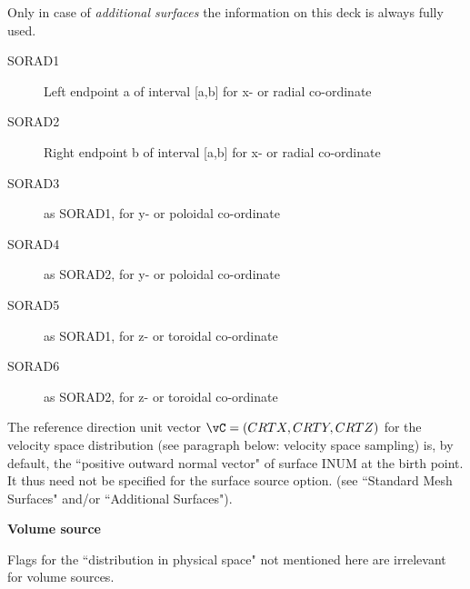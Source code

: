 Only in case of \emph{additional surfaces} the information on this deck is
always fully used.
\begin{description}
  \item[SORAD1] Left endpoint a of interval [a,b] for x- or radial co-ordinate
  \item[SORAD2] Right endpoint b of interval [a,b] for x- or radial co-ordinate
  \item[SORAD3] as SORAD1, for y- or poloidal co-ordinate
  \item[SORAD4] as
        SORAD2, for y- or poloidal co-ordinate
  \item[SORAD5] as SORAD1, for z- or
        toroidal co-ordinate
  \item[SORAD6] as SORAD2, for z- or toroidal co-ordinate
\end{description}

The reference direction unit vector $\vC = (CRTX,CRTY,CRTZ)$ for the velocity
space distribution (see paragraph below: velocity space sampling) is, by
default, the ``positive outward normal vector" of surface INUM at the birth
point.
It thus need not be specified for the surface source option.
(see ``Standard Mesh Surfaces" and/or ``Additional Surfaces").

\medskip

\textcolor[rgb]{0.00,0.00,1.00}{\textbf{Volume source}}

Flags for the ``distribution in physical space" not mentioned here are
irrelevant for volume sources.

